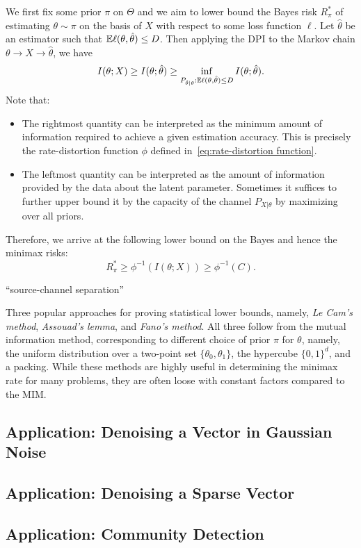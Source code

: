 We first fix some prior $\pi$ on $\Theta$ and we aim to lower bound the Bayes risk $R_\pi^*$ of estimating $\theta\sim \pi$ on the basis of $X$ with respect to some loss function $\ell$.
Let $\hat\theta$ be an estimator such that $\mathbb{E}\ell(\theta,\hat\theta)\leq D$.
Then applying the DPI to the Markov chain $\theta\to X\to\hat\theta$, we have 
\[I(\theta;X)\geq I(\theta;\hat\theta)\geq \inf_{P_{\hat\theta|\theta}:\mathbb{E}\ell(\theta,\hat\theta)\leq D}I(\theta;\hat\theta).\]
Note that:
\begin{itemize}
    \item The rightmost quantity can be interpreted as the minimum amount of information required to achieve a given estimation accuracy. This is precisely the rate-distortion function $\phi$ defined in~\eqref{eq:rate-distortion function}.
    \item The leftmost quantity can be interpreted as the amount of information provided by the data about the latent parameter. Sometimes it suffices to further upper bound it by the capacity of the channel $P_{X|\theta}$ by maximizing over all priors.
\end{itemize}
Therefore, we arrive at the following lower bound on the Bayes and hence the minimax risks:
\[R_\pi^*\geq \phi^{-1}(I(\theta;X))\geq \phi^{-1}(C).\]


``source-channel separation''

Three popular approaches for proving statistical lower bounds, namely, \textit{Le Cam's method}, \textit{Assouad's lemma}, and \textit{Fano's method}.
All three follow from the mutual information method, corresponding to different choice of prior $\pi$ for $\theta$, namely, the uniform distribution over a two-point set $\{\theta_0,\theta_1\}$, the hypercube $\{0,1\}^d$, and a packing.
While these methods are highly useful in determining the minimax rate for many problems, they are often loose with constant factors compared to the MIM.

\subsection{Application: Denoising a Vector in Gaussian Noise}

\subsection{Application: Denoising a Sparse Vector}

\subsection{Application: Community Detection}


